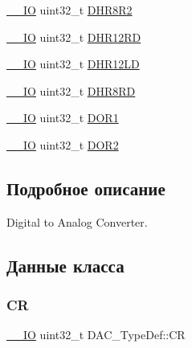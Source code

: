 \begin{DoxyCompactItemize}
\item 
\mbox{\hyperlink{group___c_m_s_i_s___c_m3__core__definitions_gaec43007d9998a0a0e01faede4133d6be}{\+\_\+\+\_\+\+IO}} uint32\+\_\+t \mbox{\hyperlink{struct_d_a_c___type_def_a3b096b71656f8fb32cd18b4c8b1d2334}{D\+H\+R8\+R2}}
\item 
\mbox{\hyperlink{group___c_m_s_i_s___c_m3__core__definitions_gaec43007d9998a0a0e01faede4133d6be}{\+\_\+\+\_\+\+IO}} uint32\+\_\+t \mbox{\hyperlink{struct_d_a_c___type_def_affa5cc9fe0cc9eb594d703bdc9d9abd9}{D\+H\+R12\+RD}}
\item 
\mbox{\hyperlink{group___c_m_s_i_s___c_m3__core__definitions_gaec43007d9998a0a0e01faede4133d6be}{\+\_\+\+\_\+\+IO}} uint32\+\_\+t \mbox{\hyperlink{struct_d_a_c___type_def_aea4d055e3697999b44cdcf2702d79d40}{D\+H\+R12\+LD}}
\item 
\mbox{\hyperlink{group___c_m_s_i_s___c_m3__core__definitions_gaec43007d9998a0a0e01faede4133d6be}{\+\_\+\+\_\+\+IO}} uint32\+\_\+t \mbox{\hyperlink{struct_d_a_c___type_def_a03f8d95bbf0ce3a53cb79506d5bf995a}{D\+H\+R8\+RD}}
\item 
\mbox{\hyperlink{group___c_m_s_i_s___c_m3__core__definitions_gaec43007d9998a0a0e01faede4133d6be}{\+\_\+\+\_\+\+IO}} uint32\+\_\+t \mbox{\hyperlink{struct_d_a_c___type_def_a50b4f0b0d2a376f729c8d7acf47864c3}{D\+O\+R1}}
\item 
\mbox{\hyperlink{group___c_m_s_i_s___c_m3__core__definitions_gaec43007d9998a0a0e01faede4133d6be}{\+\_\+\+\_\+\+IO}} uint32\+\_\+t \mbox{\hyperlink{struct_d_a_c___type_def_a1bde8391647d6422b39ab5ba4f13848b}{D\+O\+R2}}
\end{DoxyCompactItemize}


\subsection{Подробное описание}
Digital to Analog Converter. 

\subsection{Данные класса}
\mbox{\label{struct_d_a_c___type_def_a394324f0b573837ca15a87127b2a37ea}} 
\subsubsection{\texorpdfstring{CR}{CR}}
{\footnotesize\ttfamily \mbox{\hyperlink{group___c_m_s_i_s___c_m3__core__definitions_gaec43007d9998a0a0e01faede4133d6be}{\+\_\+\+\_\+\+IO}} uint32\+\_\+t D\+A\+C\+\_\+\+Type\+Def\+::\+CR}

